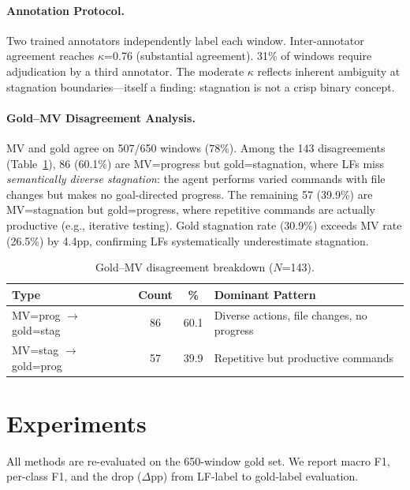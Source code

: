 \documentclass[11pt,a4paper]{article}
\begin{document}
\paragraph{Annotation Protocol.}
Two trained annotators independently label each window.
Inter-annotator agreement reaches $\kappa$=0.76 (substantial agreement).
31\% of windows require adjudication by a third annotator.
The moderate $\kappa$ reflects inherent ambiguity at stagnation boundaries---itself a finding: stagnation is not a crisp binary concept.

\paragraph{Gold--MV Disagreement Analysis.}
MV and gold agree on 507/650 windows (78\%).
Among the 143 disagreements (Table~\ref{tab:disagree}), 86 (60.1\%) are MV=progress but gold=stagnation, where LFs miss \emph{semantically diverse stagnation}: the agent performs varied commands with file changes but makes no goal-directed progress.
The remaining 57 (39.9\%) are MV=stagnation but gold=progress, where repetitive commands are actually productive (e.g., iterative testing).
Gold stagnation rate (30.9\%) exceeds MV rate (26.5\%) by 4.4pp, confirming LFs systematically underestimate stagnation.

\begin{table}[t]
\centering
\small
\caption{Gold--MV disagreement breakdown ($N$=143).}
\label{tab:disagree}
\begin{tabular}{lccl}
\toprule
\textbf{Type} & \textbf{Count} & \textbf{\%} & \textbf{Dominant Pattern} \\
\midrule
MV=prog $\to$ gold=stag & 86 & 60.1 & Diverse actions, file changes, no progress \\
MV=stag $\to$ gold=prog & 57 & 39.9 & Repetitive but productive commands \\
\bottomrule
\end{tabular}
\end{table}

\section{Experiments}
\label{sec:exp}

All methods are re-evaluated on the 650-window gold set.
We report macro F1, per-class F1, and the drop ($\Delta$pp) from LF-label to gold-label evaluation.
\end{document}
